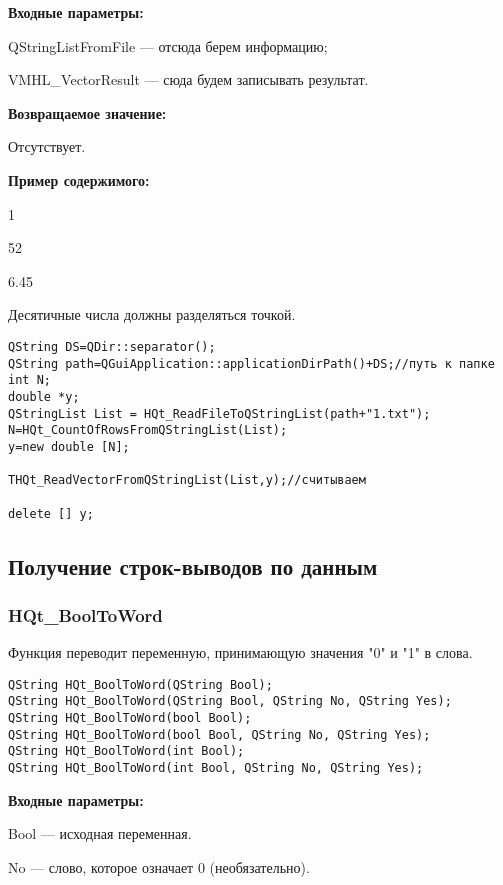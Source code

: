 \documentclass[a4paper,12pt]{article}
\begin{document}
\textbf{Входные параметры:}

QStringListFromFile --- отсюда берем информацию;

     VMHL\_VectorResult --- сюда будем записывать результат.

\textbf{Возвращаемое значение:}

Отсутствует.

\textbf{Пример содержимого:}

1

52

6.45

Десятичные числа должны разделяться точкой.


\begin{lstlisting}[label=code_use_THQt_ReadVectorFromQStringList,caption=Пример использования]
QString DS=QDir::separator();
QString path=QGuiApplication::applicationDirPath()+DS;//путь к папке
int N;
double *y;
QStringList List = HQt_ReadFileToQStringList(path+"1.txt");
N=HQt_CountOfRowsFromQStringList(List);
y=new double [N];

THQt_ReadVectorFromQStringList(List,y);//считываем

delete [] y;
\end{lstlisting}

\subsection{Получение строк-выводов по данным}

\subsubsection{HQt\_BoolToWord}\label{HQt_BoolToWord}

Функция переводит переменную, принимающую значения "0" и "1" в слова.


\begin{lstlisting}[label=code_syntax_HQt_BoolToWord,caption=Синтаксис]
QString HQt_BoolToWord(QString Bool);
QString HQt_BoolToWord(QString Bool, QString No, QString Yes);
QString HQt_BoolToWord(bool Bool);
QString HQt_BoolToWord(bool Bool, QString No, QString Yes);
QString HQt_BoolToWord(int Bool);
QString HQt_BoolToWord(int Bool, QString No, QString Yes);
\end{lstlisting}

\textbf{Входные параметры:}

Bool --- исходная переменная.
 
	No --- слово, которое означает 0 (необязательно).
 
\end{document}

